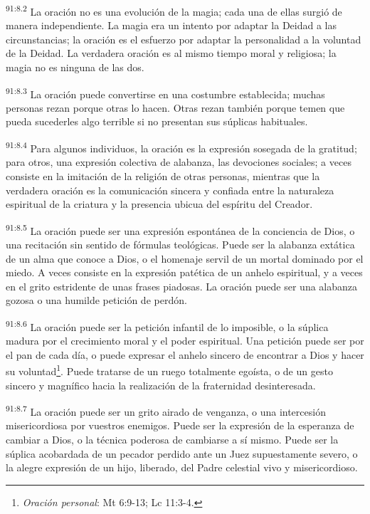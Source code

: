 \documentclass[twoside, 11pt]{book}
\begin{document}
\par
\textsuperscript{91:8.2} La oración no es una evolución de la magia; cada una de ellas surgió de manera independiente. La magia era un intento por adaptar la Deidad a las circunstancias; la oración es el esfuerzo por adaptar la personalidad a la voluntad de la Deidad. La verdadera oración es al mismo tiempo moral y religiosa; la magia no es ninguna de las dos.

\par
\textsuperscript{91:8.3} La oración puede convertirse en una costumbre establecida; muchas personas rezan porque otras lo hacen. Otras rezan también porque temen que pueda sucederles algo terrible si no presentan sus súplicas habituales.

\par
\textsuperscript{91:8.4} Para algunos individuos, la oración es la expresión sosegada de la gratitud; para otros, una expresión colectiva de alabanza, las devociones sociales; a veces consiste en la imitación de la religión de otras personas, mientras que la verdadera oración es la comunicación sincera y confiada entre la naturaleza espiritual de la criatura y la presencia ubicua del espíritu del Creador.

\par
\textsuperscript{91:8.5} La oración puede ser una expresión espontánea de la conciencia de Dios, o una recitación sin sentido de fórmulas teológicas. Puede ser la alabanza extática de un alma que conoce a Dios, o el homenaje servil de un mortal dominado por el miedo. A veces consiste en la expresión patética de un anhelo espiritual, y a veces en el grito estridente de unas frases piadosas. La oración puede ser una alabanza gozosa o una humilde petición de perdón.

\par
\textsuperscript{91:8.6} La oración puede ser la petición infantil de lo imposible, o la súplica madura por el crecimiento moral y el poder espiritual. Una petición puede ser por el pan de cada día, o puede expresar el anhelo sincero de encontrar a Dios y hacer su voluntad\footnote{\textit{Oración personal}: Mt 6:9-13; Lc 11:3-4.}. Puede tratarse de un ruego totalmente egoísta, o de un gesto sincero y magnífico hacia la realización de la fraternidad desinteresada.

\par
\textsuperscript{91:8.7} La oración puede ser un grito airado de venganza, o una intercesión misericordiosa por vuestros enemigos. Puede ser la expresión de la esperanza de cambiar a Dios, o la técnica poderosa de cambiarse a sí mismo. Puede ser la súplica acobardada de un pecador perdido ante un Juez supuestamente severo, o la alegre expresión de un hijo, liberado, del Padre celestial vivo y misericordioso.
\end{document}
